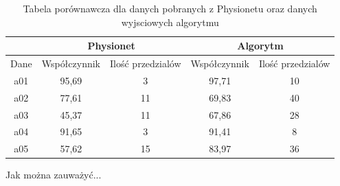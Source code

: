 \begin{table}[!ht]
  \centering
  \begin{tabular}{|c|c|c|c|c|}
    \hline
  &\multicolumn{2}{|c|}{Physionet}&\multicolumn{2}{|c|}{Algorytm} \\
    \hline
Dane&Współczynnik&Ilość przedzialów&Współczynnik&Ilość przedzialów \\
    \hline
    a01 & 95,69 & 3 & 97,71 & 10 \\
    a02 & 77,61 & 11 &  69,83 & 40 \\
    a03 & 45,37 & 11 &  67,86 & 28 \\
    a04 & 91,65 & 3 & 91,41 & 8 \\
    a05 & 57,62 & 15 & 83,97 & 36 \\
    \hline
  \end{tabular}
\caption{Tabela porównawcza dla danych pobranych z Physionetu oraz danych wyjsciowych algorytmu }
\end{table}

Jak można zauważyć...